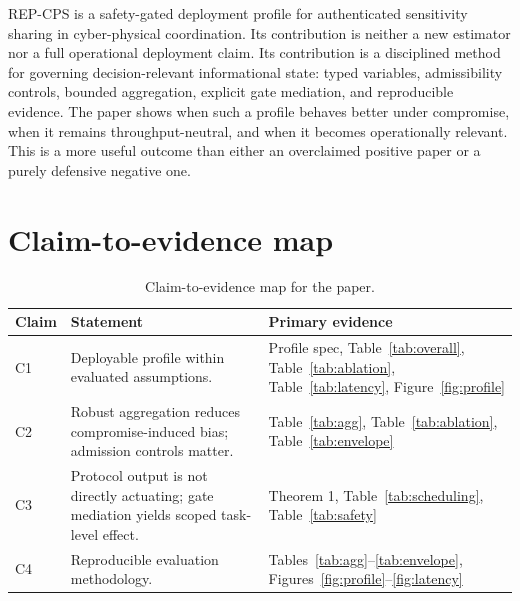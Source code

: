 \documentclass[11pt]{article}
\newcommand{\repcps}{REP-CPS}
\begin{document}
\repcps{} is a safety-gated deployment profile for authenticated sensitivity sharing in cyber-physical coordination. Its contribution is neither a new estimator nor a full operational deployment claim. Its contribution is a disciplined method for governing decision-relevant informational state: typed variables, admissibility controls, bounded aggregation, explicit gate mediation, and reproducible evidence. The paper shows when such a profile behaves better under compromise, when it remains throughput-neutral, and when it becomes operationally relevant. This is a more useful outcome than either an overclaimed positive paper or a purely defensive negative one.

\appendix

\section{Claim-to-evidence map}

\begin{table}[H]
\centering
\caption{Claim-to-evidence map for the paper.}
\label{tab:claims-map}
\begin{tabular}{p{1.1cm}p{8.4cm}p{4.0cm}}
\toprule
Claim & Statement & Primary evidence \\
\midrule
C1 & Deployable profile within evaluated assumptions. & Profile spec, Table~\ref{tab:overall}, Table~\ref{tab:ablation}, Table~\ref{tab:latency}, Figure~\ref{fig:profile} \\
C2 & Robust aggregation reduces compromise-induced bias; admission controls matter. & Table~\ref{tab:agg}, Table~\ref{tab:ablation}, Table~\ref{tab:envelope} \\
C3 & Protocol output is not directly actuating; gate mediation yields scoped task-level effect. & Theorem 1, Table~\ref{tab:scheduling}, Table~\ref{tab:safety} \\
C4 & Reproducible evaluation methodology. & Tables~\ref{tab:agg}--\ref{tab:envelope}, Figures~\ref{fig:profile}--\ref{fig:latency} \\
\bottomrule
\end{tabular}
\end{table}
\end{document}
